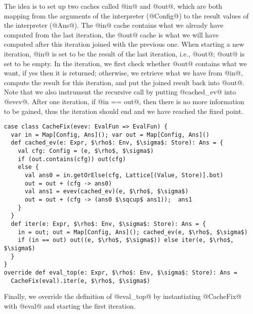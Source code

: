 The idea is to set up two caches called @in@ and @out@, which are both mapping
from the arguments of the interpreter (@Config@) to the result values of the
interpreter (@Ans@). The @in@ cache contains what we already have computed from
the last iteration, the @out@ cache is what we will have computed after this
iteration joined with the previous one. When starting a new iteration, @in@ is
set to be the result of the last iteration, i.e., @out@; @out@ is set to be
empty. In the iteration, we first check whether @out@ contains what we want, if
yes then it is returned; otherwise, we retrieve what we have from @in@, compute
the result for this iteration, and put the joined result back into @out@. Note
that we also instrument the recursive call by putting @cached_ev@ into @evev@.
After one iteration, if @in == out@, then there is no more information to be
gained, thus the iteration should end and we have reached the fixed point.

\begin{lstlisting}
case class CacheFix(evev: EvalFun => EvalFun) {
  var in = Map[Config, Ans](); var out = Map[Config, Ans]()
  def cached_ev(e: Expr, $\rho$: Env, $\sigma$: Store): Ans = {
    val cfg: Config = (e, $\rho$, $\sigma$)
    if (out.contains(cfg)) out(cfg)
    else {
      val ans0 = in.getOrElse(cfg, Lattice[(Value, Store)].bot)
      out = out + (cfg -> ans0)
      val ans1 = evev(cached_ev)(e, $\rho$, $\sigma$)
      out = out + (cfg -> (ans0 $\sqcup$ ans1));  ans1
    }
  }
  def iter(e: Expr, $\rho$: Env, $\sigma$: Store): Ans = {
    in = out; out = Map[Config, Ans](); cached_ev(e, $\rho$, $\sigma$)
    if (in == out) out((e, $\rho$, $\sigma$)) else iter(e, $\rho$, $\sigma$)
  }
}
override def eval_top(e: Expr, $\rho$: Env, $\sigma$: Store): Ans = 
  CacheFix(eval).iter(e, $\rho$, $\sigma$)
\end{lstlisting}

Finally, we override the definition of @eval_top@ by instantiating @CacheFix@
with @eval@ and starting the first iteration.

